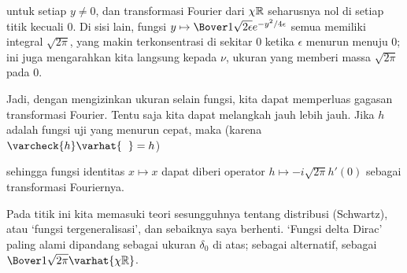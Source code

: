 {\noindent untuk setiap $y\ne 0$, dan transformasi Fourier dari $\chi\Bbb R$
seharusnya nol di setiap titik kecuali $0$. Di sisi lain, fungsi $y\mapsto
\Bover1{\sqrt{2\epsilon}}e^{-y^2/4\epsilon}$ semua memiliki integral
$\sqrt{2\pi}$, yang makin terkonsentrasi di sekitar $0$ ketika $\epsilon$
menurun menuju $0$; ini juga mengarahkan kita langsung kepada $\nu$, ukuran
yang memberi massa $\sqrt{2\pi}$ pada $0$.

Jadi, dengan mengizinkan ukuran selain fungsi, kita dapat memperluas gagasan
transformasi Fourier. Tentu saja kita dapat melangkah jauh lebih jauh. Jika
$h$ adalah fungsi uji yang menurun cepat, maka (karena
$\varcheck{h}\varhat{\phantom{h}}=h$)


\noindent sehingga fungsi identitas $x\mapsto x$ dapat diberi operator
$h\mapsto -i\sqrt{2\pi}h'(0)$ sebagai transformasi Fouriernya.

Pada titik ini kita memasuki teori sesungguhnya tentang distribusi
(Schwartz), atau `fungsi tergeneralisasi', dan sebaiknya saya berhenti. `Fungsi
delta Dirac' paling alami dipandang sebagai ukuran $\delta_0$ di atas; sebagai
alternatif, sebagai $\Bover1{\sqrt{2\pi}}\varhat{\chi\Bbb R}$. }%

